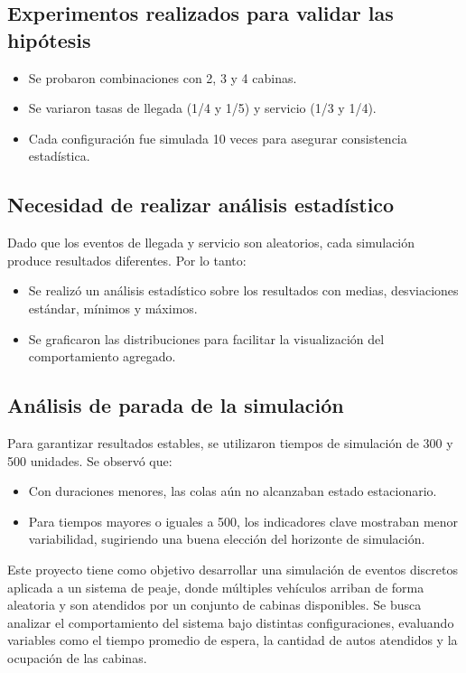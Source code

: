 \documentclass[12pt]{article}
\begin{document}
\subsection*{Experimentos realizados para validar las hipótesis}
\begin{itemize}
    \item Se probaron combinaciones con 2, 3 y 4 cabinas.
    \item Se variaron tasas de llegada (1/4 y 1/5) y servicio (1/3 y 1/4).
    \item Cada configuración fue simulada 10 veces para asegurar consistencia estadística.
\end{itemize}

\subsection*{Necesidad de realizar análisis estadístico}
Dado que los eventos de llegada y servicio son aleatorios, cada simulación produce resultados diferentes. Por lo tanto:
\begin{itemize}
    \item Se realizó un análisis estadístico sobre los resultados con medias, desviaciones estándar, mínimos y máximos.
    \item Se graficaron las distribuciones para facilitar la visualización del comportamiento agregado.
\end{itemize}

\subsection*{Análisis de parada de la simulación}
Para garantizar resultados estables, se utilizaron tiempos de simulación de 300 y 500 unidades. Se observó que:
\begin{itemize}
    \item Con duraciones menores, las colas aún no alcanzaban estado estacionario.
    \item Para tiempos mayores o iguales a 500, los indicadores clave mostraban menor variabilidad, sugiriendo una buena elección del horizonte de simulación.
\end{itemize}

Este proyecto tiene como objetivo desarrollar una simulación de eventos discretos aplicada a un sistema de peaje, donde múltiples vehículos arriban de forma aleatoria y son atendidos por un conjunto de cabinas disponibles. Se busca analizar el comportamiento del sistema bajo distintas configuraciones, evaluando variables como el tiempo promedio de espera, la cantidad de autos atendidos y la ocupación de las cabinas.
\end{document}
